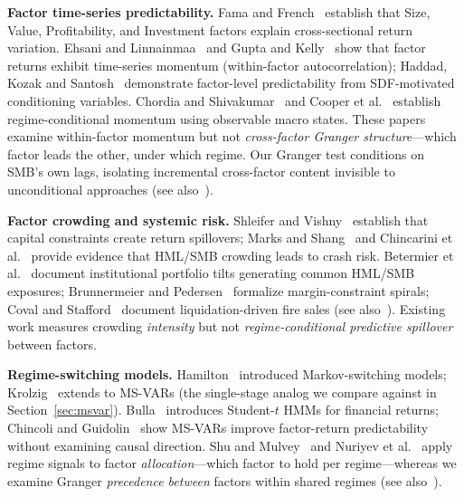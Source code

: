 \documentclass[sigconf,anonymous]{acmart}
\begin{document}
\textbf{Factor time-series predictability.}
Fama and French~\cite{fama1993common,fama2015five} establish that Size, Value,
Profitability, and Investment factors explain cross-sectional return variation.
Ehsani and Linnainmaa~\cite{ehsani2022factor} and Gupta and Kelly~\cite{gupta2019factor}
show that factor returns exhibit time-series momentum (within-factor autocorrelation);
Haddad, Kozak and Santosh~\cite{haddad2020factor} demonstrate factor-level predictability
from SDF-motivated conditioning variables.
Chordia and Shivakumar~\cite{chordia2002momentum} and Cooper et al.~\cite{cooper2004market}
establish regime-conditional momentum using observable macro states.
These papers examine within-factor momentum but not \emph{cross-factor Granger structure}---which
factor leads the other, under which regime. Our Granger test conditions on SMB's own lags,
isolating incremental cross-factor content invisible to unconditional approaches
(see also~\cite{jegadeesh1993returns,carhart1997persistence,barroso2015momentum,daniel2016momentum,flogel2022momentum,neuhierl2024timing,asness2013value}).

\textbf{Factor crowding and systemic risk.}
Shleifer and Vishny~\cite{shleifer1997limits} establish that capital constraints create
return spillovers; Marks and Shang~\cite{marks2019factor} and Chincarini et al.~\cite{chincarini2026crowded}
provide evidence that HML/SMB crowding leads to crash risk.
Betermier et al.~\cite{betermier2025investor} document institutional portfolio tilts
generating common HML/SMB exposures; Brunnermeier and Pedersen~\cite{brunnermeier2009market}
formalize margin-constraint spirals; Coval and Stafford~\cite{coval2007asset} document
liquidation-driven fire sales
(see also~\cite{stein2009presidential,anton2014connected,lou2022comomentum,kang2021crowding,volpati2020zooming,hua2024dynamics,greenwood2011stock}).
Existing work measures crowding \emph{intensity} but not
\emph{regime-conditional predictive spillover} between factors.

\textbf{Regime-switching models.}
Hamilton~\cite{hamilton1989new} introduced Markov-switching models;
Krolzig~\cite{krolzig1997markov} extends to MS-VARs (the single-stage analog we
compare against in Section~\ref{sec:msvar}).
Bulla~\cite{bulla2011hidden} introduces Student-$t$ HMMs for financial returns;
Chincoli and Guidolin~\cite{chincoli2017linear} show MS-VARs improve factor-return
predictability without examining causal direction.
Shu and Mulvey~\cite{shu2025dynamic} and Nuriyev et al.~\cite{nuriyev2024regime}
apply regime signals to factor \emph{allocation}---which factor to hold per regime---whereas
we examine Granger \emph{precedence between} factors within shared regimes
(see also~\cite{ang2002regime,guidolin2007asset,guidolin2008size,oelschlager2024fhmm,ang2012regime,baitinger2024simplicity,shu2024downside,wang2020regime}).
\end{document}
